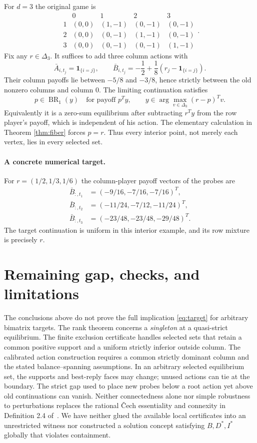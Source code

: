 \documentclass[11pt]{article}
\newcommand{\BR}{\operatorname{BR}}
\theoremstyle{definition}
\theoremstyle{remark}
\begin{document}
For $d=3$ the original game is
\[
\begin{array}{c|cccc}
 &0&1&2&3\\\hline
1&(0,0)&(1,-1)&(0,-1)&(0,-1)\\
2&(0,0)&(0,-1)&(1,-1)&(0,-1)\\
3&(0,0)&(0,-1)&(0,-1)&(1,-1)
\end{array}.
\]
Fix any $r\in\Delta_3$. It suffices to add three column actions with
\[
 \bar A_{i,t_j}=\mathbf1_{\{i=j\}},\qquad
 \bar B_{i,t_j}=-\frac12+\frac18
                       \left(r_j-\mathbf1_{\{i=j\}}\right).
\]
Their column payoffs lie between $-5/8$ and $-3/8$, hence strictly
between the old nonzero columns and column $0$.
The limiting continuation satisfies
\[
 p\in\BR_1(y)\quad\text{for payoff }p^Ty,
 \qquad
 y\in\arg\max_{v\in\Delta_3}(r-p)^Tv.
\]
Equivalently it is a zero-sum equilibrium after subtracting $r^Ty$
from the row player's payoff, which is independent of his action.
The elementary calculation in Theorem \ref{thm:fiber} forces $p=r$.
Thus every interior point, not merely each vertex, lies in every
selected set.

\paragraph{A concrete numerical target.}
For $r=(1/2,1/3,1/6)$ the column-player payoff vectors of the probes are
\[
 \begin{aligned}
 \bar B_{:,t_1}&=(-9/16,-7/16,-7/16)^T,\\
 \bar B_{:,t_2}&=(-11/24,-7/12,-11/24)^T,\\
 \bar B_{:,t_3}&=(-23/48,-23/48,-29/48)^T.
 \end{aligned}
\]
The target continuation is uniform in this interior example, and its
row mixture is precisely $r$.


\section{Remaining gap, checks, and limitations}
The conclusions above do not prove the full implication
\eqref{eq:target} for arbitrary bimatrix targets. The rank theorem
concerns a \emph{singleton} at a quasi-strict equilibrium. The finite
exclusion certificate handles selected sets that retain a common
positive support and a uniform strictly inferior outside column.
The calibrated action construction requires a common strictly dominant
column and the stated balance--spanning assumptions. In an arbitrary
selected equilibrium set, the supports and best-reply faces may change;
unused actions can tie at the boundary. The strict gap used to place
new probes below a root action yet above old continuations can vanish.
Neither connectedness alone nor simple robustness to perturbations
replaces the rational \v Cech essentiality and connexity in
Definition 2.4 of~\cite{gw}. We have neither glued the available local
certificates into an unrestricted witness nor constructed a solution
concept satisfying $B,D^*,I^*$ globally that violates containment.
\end{document}
